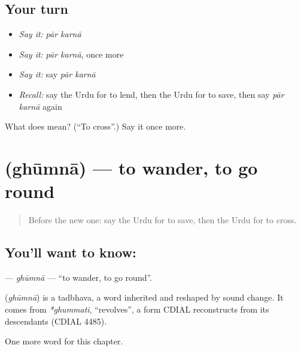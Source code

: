 \subsection*{Your turn}
\begin{itemize}
\raggedright
  \item \emph{Say it:} \emph{pār karnā}
  \item \emph{Say it:} \emph{pār karnā}, once more
  \item \emph{Say it:} say \emph{pār karnā}
  \item \emph{Recall:} say the Urdu for to lend, then the Urdu for to save, then say \emph{pār karnā} again
\end{itemize}

\begin{tcolorbox}[breakable,colback=teal!4,colframe=teal!35!black,title={Before you move on}]
What does   mean? (\textquotedblleft{}To cross\textquotedblright{}.) Say it once more.
\end{tcolorbox}
\section[\texorpdfstring{\ur{گھومنا} (ghūmnā)}{گھومنا (ghūmnā)}]{ (ghūmnā) — to wander, to go round}

\label{lesson:UR-C149-ghumna}



\begin{quote}
Before the new one: say the Urdu for to save, then the Urdu for to cross.
\end{quote}

\subsection*{You'll want to know: }
\textbf{} — \emph{ghūmnā} — \textquotedblleft{}to wander, to go round\textquotedblright{}.

\begin{cousinweb}
\textbf{} (\emph{ghūmnā}) is a tadbhava, a word inherited and reshaped by sound change. It comes from \emph{*ghummati}, \textquotedblleft{}revolves\textquotedblright{}, a form CDIAL reconstructs from its descendants (CDIAL 4485).
\end{cousinweb}

\begin{grammarlens}[title={What you've built}]
One more word for this chapter.
\end{grammarlens}

